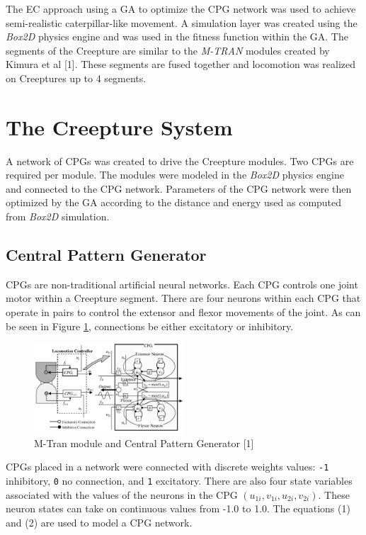 \documentclass{acm_proc_article-sp}
\begin{document}
The EC approach using a GA to optimize the CPG network was used to
achieve semi-realistic caterpillar-like movement. A simulation layer was
created using the \emph{Box2D} physics engine and was used in the
fitness function within the GA. The segments of the Creepture are similar
to the \emph{M-TRAN} modules created by Kimura et al {[}1{]}. These
segments are fused together and locomotion was realized on Creeptures up
to 4 segments.

\section{The Creepture System}
A network of CPGs was created to drive the Creepture modules. Two CPGs
are required per module. The modules were modeled in the \emph{Box2D}
physics engine and connected to the CPG network. Parameters of the CPG
network were then optimized by the GA according to the distance and
energy used as computed from \emph{Box2D} simulation.

\subsection{Central Pattern Generator}

CPGs are non-traditional artificial neural networks.  Each CPG controls
one joint motor within a Creepture segment. There are four neurons within
each CPG that operate in pairs to control the extensor and flexor
movements of the joint. As can be seen in Figure \ref{cpgpic},
connections be either excitatory or inhibitory.

\begin{figure}
\centering
\includegraphics[width=0.5\textwidth]{images/cpg.png}
\caption{M-Tran module and Central Pattern Generator [1] \label{cpgpic}}
\end{figure}

CPGs placed in a network were connected with discrete weights values:
\texttt{-1} inhibitory, \texttt{0} no connection, and \texttt{1}
excitatory. There are also four state variables associated with the
values of the neurons in the CPG $(u_{1i}, v_{1i}, u_{2i}, v_{2i})$.
These neuron states can take on continuous values from -1.0 to 1.0. The
equations (1) and (2) are used to model a CPG network.
\end{document}
